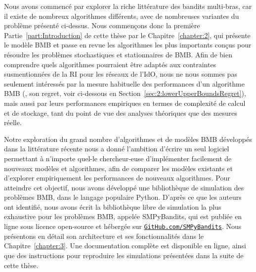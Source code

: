 \begin{resume_fr}
%
Nous avons commencé par explorer la riche littérature des bandits multi-bras,
car il existe de nombreux algorithmes différents, avec de nombreuses variantes du problème présenté ci-dessus.
Nous commençons donc la première Partie~\ref{part:Introduction} de cette thèse par le Chapitre~\ref{chapter:2}, qui présente le modèle BMB et passe en revue les algorithmes les plus importants conçus pour résoudre les problèmes stochastiques et stationnaires de BMB.
%
Afin de bien comprendre quels algorithmes pourraient être adaptés aux contraintes susmentionnées de la RI pour les réseaux de l'IdO,
nous ne nous sommes pas seulement intéressés par la mesure habituelle des performances d'un algorithme BMB (\ie, son regret, voir ci-dessous en Section~\ref{sec:2:lowerUpperBoundsRegret}),
mais aussi par leurs performances empiriques en termes de complexité de calcul et de stockage, tant du point de vue des analyses théoriques que des mesures réelle.


%
Notre exploration du grand nombre d'algorithmes et de modèles BMB développés dans la littérature récente
nous a donné l'ambition d'écrire un seul logiciel permettant à n'importe quel-le chercheur-euse d'implémenter facilement de nouveaux modèles et algorithmes, afin de comparer les modèles existants et d'explorer empiriquement les performances de nouveaux algorithmes.
Pour atteindre cet objectif, nous avons développé une bibliothèque de simulation des problèmes BMB, dans le langage populaire Python.
%
D'après ce que les auteurs ont identifié,
nous avons écrit la bibliothèque libre de simulation la plus exhaustive pour les problèmes BMB, appelée SMPyBandits, qui est publiée en ligne sous licence open-source \cite{SMPyBanditsJMLR,SMPyBandits} et hébergée sur \href{https://GitHub.com/SMPyBandits}{\texttt{GitHub.com/SMPyBandits}}.
Nous présentons en détail son architecture et ses fonctionnalités dans le Chapitre~\ref{chapter:3}.
Une documentation complète est disponible en ligne, ainsi que des instructions pour reproduire les simulations présentées dans la suite de cette thèse.



\end{resume_fr}
